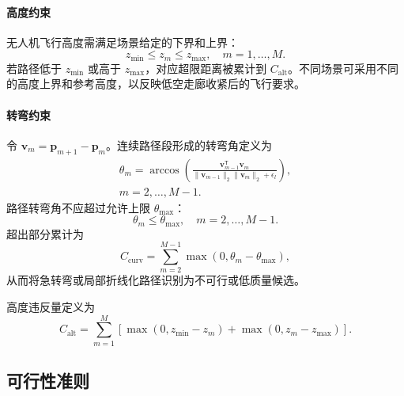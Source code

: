 \paragraph{高度约束}
无人机飞行高度需满足场景给定的下界和上界：
\begin{equation}
    z_{\min} \leq z_m \leq z_{\max}, \quad m=1,\ldots,M.
    \label{eq:altitude-constraint}
\end{equation}
若路径低于 $z_{\min}$ 或高于 $z_{\max}$，对应超限距离被累计到 $C_{\mathrm{alt}}$。不同场景可采用不同的高度上界和参考高度，以反映低空走廊收紧后的飞行要求。

\paragraph{转弯约束}
令 $\mathbf v_m=\mathbf p_{m+1}-\mathbf p_m$。连续路径段形成的转弯角定义为
\begin{equation}
    \begin{aligned}
    \theta_m=
    \arccos
    \left(
    \frac{\mathbf v_{m-1}^\mathsf{T}\mathbf v_m}
    {\|\mathbf v_{m-1}\|_2\|\mathbf v_m\|_2+\epsilon_l}
    \right),\\
    m=2,\ldots,M-1 .
    \end{aligned}
    \label{eq:turning-angle}
\end{equation}
路径转弯角不应超过允许上限 $\theta_{\max}$：
\begin{equation}
    \theta_m \leq \theta_{\max}, \quad m=2,\ldots,M-1.
    \label{eq:turning-constraint}
\end{equation}
超出部分累计为
\begin{equation}
    C_{\mathrm{curv}}=\sum_{m=2}^{M-1}\max(0,\theta_m-\theta_{\max}),
    \label{eq:curvature-violation}
\end{equation}
从而将急转弯或局部折线化路径识别为不可行或低质量候选。

高度违反量定义为
\begin{equation}
    C_{\mathrm{alt}}=
    \sum_{m=1}^{M}
    \left[
    \max(0,z_{\min}-z_m)+
    \max(0,z_m-z_{\max})
    \right].
    \label{eq:altitude-violation}
\end{equation}

\subsection{可行性准则}

